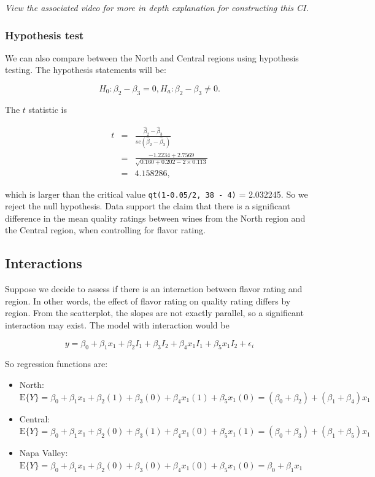 \documentclass[
]{book}
\begin{document}
\emph{View the associated video for more in depth explanation for constructing this CI.}

\hypertarget{hypothesis-test}{%
\subsubsection{Hypothesis test}\label{hypothesis-test}}

We can also compare between the North and Central regions using hypothesis testing. The hypothesis statements will be:

\[
H_0: \beta_2 - \beta_3 = 0, H_a: \beta_2 - \beta_3 \neq 0.
\]

The \(t\) statistic is

\begin{eqnarray*}
t &=& \frac{\hat{\beta}_2 - \hat{\beta}_3}{se\left(\hat{\beta}_2-\hat{\beta}_3\right)}\nonumber \\
  &=& \frac{-1.2234 + 2.7569}{\sqrt{0.160 + 0.202 - 2 \times 0.113}} \nonumber \\
  &=& 4.158286,
\end{eqnarray*}

which is larger than the critical value \texttt{qt(1-0.05/2,\ 38\ -\ 4)} = 2.032245. So we reject the null hypothesis. Data support the claim that there is a significant difference in the mean quality ratings between wines from the North region and the Central region, when controlling for flavor rating.

\hypertarget{interactions}{%
\subsection{Interactions}\label{interactions}}

Suppose we decide to assess if there is an interaction between flavor rating and region. In other words, the effect of flavor rating on quality rating differs by region. From the scatterplot, the slopes are not exactly parallel, so a significant interaction may exist. The model with interaction would be

\begin{equation*}
y = \beta_0 + \beta_1x_{1} + \beta_2I_{1} + \beta_3I_{2} + \beta_4 x_1 I_{1} + \beta_5 x_1 I_{2} + \epsilon_i
\end{equation*}

So regression functions are:

\begin{itemize}
\item
  North: \(\mbox{E}\{Y\} = \beta_0 + \beta_1x_1 + \beta_2(1) + \beta_3(0) + \beta_4x_1(1) + \beta_5x_1(0) = (\beta_0+\beta_2) + (\beta_1 + \beta_4)x_1\)
\item
  Central: \(\mbox{E}\{Y\} = \beta_0 + \beta_1x_1 + \beta_2(0) + \beta_3(1) + \beta_4x_1(0) + \beta_5x_1(1) = (\beta_0+\beta_3) + (\beta_1 + \beta_5)x_1\)
\item
  Napa Valley: \(\mbox{E}\{Y\} = \beta_0 + \beta_1x_1 + \beta_2(0) + \beta_3(0) + \beta_4x_1(0) + \beta_5x_1(0) =\beta_0 + \beta_1x_1\)
\end{itemize}
\end{document}
